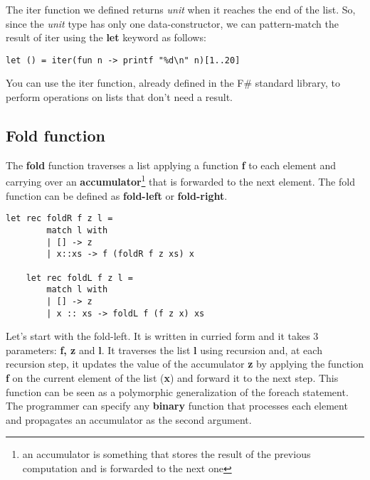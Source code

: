 The iter function we defined returns \textit{unit} when it reaches the end of the list. So, since the \textit{unit} type has only one data-constructor, we can pattern-match the result of iter using the \textbf{let} keyword as follows:
\begin{lstlisting}[style = FSharpStyle]
    let () = iter(fun n -> printf "%d\n" n)[1..20]
\end{lstlisting}
You can use the iter function, already defined in the F\# standard library, to perform operations on lists that don't need a result.
\subsection{Fold function}
The \textbf{fold} function traverses a list applying a function \textbf{f} to each element and carrying over an \textbf{accumulator}\footnote{an accumulator is something that stores the result of the previous computation and is forwarded to the next one} that is forwarded to the next element.\newline\newline
The fold function can be defined as \textbf{fold-left} or \textbf{fold-right}.
\begin{lstlisting}[style = FSharpStyle]
    let rec foldR f z l = 
        match l with
        | [] -> z
        | x::xs -> f (foldR f z xs) x
    
    let rec foldL f z l =
        match l with
        | [] -> z
        | x :: xs -> foldL f (f z x) xs    
\end{lstlisting}
Let's start with the fold-left. It is written in curried form and it takes 3 parameters: \textbf{f, z} and \textbf{l}. It traverses the list \textbf{l} using recursion and, at each recursion step, it updates the value of the accumulator \textbf{z} by applying the function \textbf{f} on the current element of the list (\textbf{x}) and forward it to the next step. This function can be seen as a polymorphic generalization of the foreach statement. The programmer can specify any \textbf{binary} function that processes each element and propagates an accumulator as the second argument.

